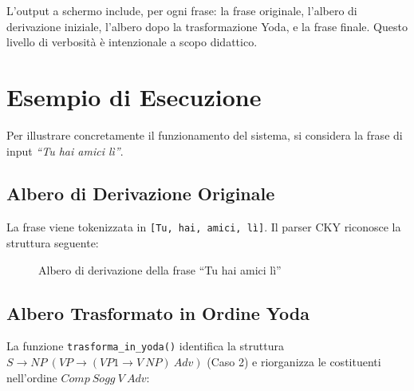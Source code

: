 \documentclass[12pt, a4paper]{article}
\begin{document}
L'output a schermo include, per ogni frase: la frase originale, l'albero di
derivazione iniziale, l'albero dopo la trasformazione Yoda, e la frase finale.
Questo livello di verbosità è intenzionale a scopo didattico.

\section{Esempio di Esecuzione}

Per illustrare concretamente il funzionamento del sistema, si considera la frase
di input \textit{``Tu hai amici lì''}.

\subsection{Albero di Derivazione Originale}

La frase viene tokenizzata in \texttt{[Tu, hai, amici, lì]}. Il parser CKY
riconosce la struttura seguente:

\begin{figure}[H]
\centering
{}
\caption{Albero di derivazione della frase ``Tu hai amici lì''}
\end{figure}

\subsection{Albero Trasformato in Ordine Yoda}

La funzione \texttt{trasforma\_in\_yoda()} identifica la struttura
$S \rightarrow NP\ (VP \rightarrow (VP1 \rightarrow V\ NP)\ Adv)$
(Caso 2) e riorganizza le costituenti nell'ordine $Comp\ Sogg\ V\ Adv$:
\end{document}
